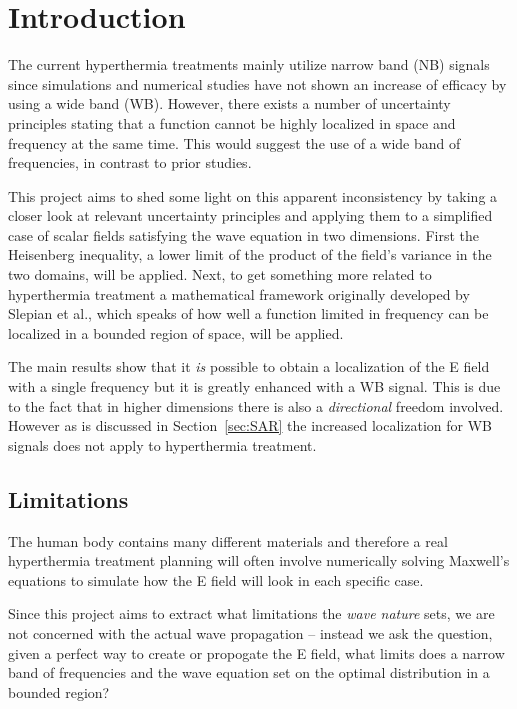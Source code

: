 \documentclass[11pt,a4paper, 
swedish,english %
]{article}
\begin{document}
\section{Introduction}

The current hyperthermia treatments mainly utilize narrow band (NB) signals since simulations and numerical studies have not shown an increase of efficacy by using a wide band (WB)\cite{Martinsson}. 
However, there exists a number of uncertainty principles stating that a function cannot be highly localized in space and frequency at the same time. This would suggest the use of a wide band of frequencies, in contrast to prior studies.

This project aims to shed some light on this apparent inconsistency by taking a closer look at relevant uncertainty principles and applying them to a simplified case of scalar fields satisfying the wave equation in two dimensions.
First the Heisenberg inequality, a lower limit of the product of the field's variance in the two domains, will be applied.
Next, to get something more related to hyperthermia treatment a mathematical framework originally developed by Slepian et al., which speaks of how well a function limited in frequency can be localized in a bounded region of space, will be applied.

The main results show that it \emph{is} possible to obtain a localization of the E field with a single frequency but it is greatly enhanced with a WB signal. This is due to the fact that in higher dimensions there is also a \emph{directional} freedom involved. However as is discussed in Section~\ref{sec:SAR} the increased localization for WB signals does not apply to hyperthermia treatment. 



\subsection{Limitations}
The human body contains many different materials and therefore a real hyperthermia treatment planning will often involve numerically solving Maxwell's equations to simulate how the E field will look in each specific case.

Since this project aims to extract what limitations the \emph{wave nature} sets, we are not concerned with the actual wave propagation -- instead we ask the question, given a perfect way to create or propogate the E field, what limits does a narrow band of frequencies and the wave equation set on the optimal distribution in a bounded region?
\end{document}
